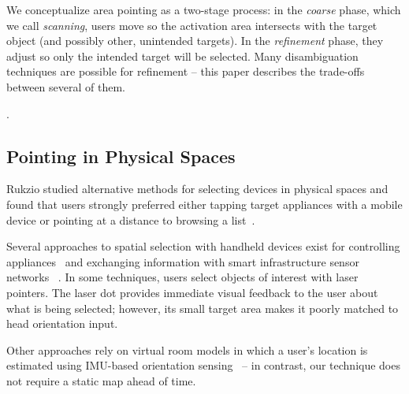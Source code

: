 We conceptualize area pointing as a two-stage process: in the {\em coarse} phase, which we call {\em scanning}, users move so the activation area intersects with the target object (and possibly other, unintended targets). In the {\em refinement} phase, they adjust so only the intended target will be selected. Many disambiguation techniques are possible for refinement -- this paper describes the trade-offs between several of them.

.

\subsection{Pointing in Physical Spaces}
Rukzio studied alternative methods for selecting devices in physical spaces and found that users strongly preferred either tapping target appliances with a mobile device or pointing at a distance to browsing a list~\cite{rukzio_experimental_2006}.

Several approaches to spatial selection with handheld devices exist for controlling appliances~\cite{beigl_point_1999,patel_2-way_2003,wilson_xwand:_2003,schmidt_picontrol:_2012,kemp_point-and-click_2008} and exchanging information with smart infrastructure sensor networks ~\cite{lifton_tricorder:_2007,mittal_ubicorder:_2011,costanza_sensortune:_2010}. In some techniques, users select objects of interest with laser pointers. The laser dot provides immediate visual feedback to the user about what is being selected; however, its small target area makes it poorly matched to head orientation input.

Other approaches rely on virtual room models in which a user's location is estimated using IMU-based orientation sensing~\cite{wilson_xwand:_2003,lifton_tricorder:_2007} -- in contrast, our technique does not require a static map ahead of time.

